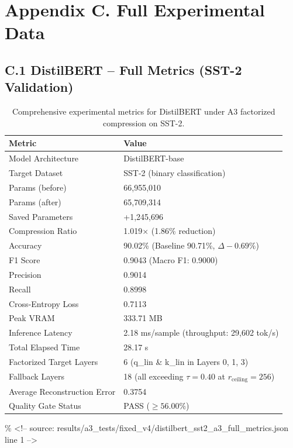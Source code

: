 \section{Appendix C. Full Experimental Data}

\subsection{C.1 DistilBERT -- Full Metrics (SST-2 Validation)}

\begin{table}[H]
\centering
\small
\begin{tabular}{ll}
\toprule
\textbf{Metric} & \textbf{Value} \\
\midrule
Model Architecture & DistilBERT-base \\
Target Dataset & SST-2 (binary classification) \\
Params (before) & 66,955,010 \\
Params (after) & 65,709,314 \\
Saved Parameters & +1,245,696 \\
Compression Ratio & 1.019$\times$ (1.86\% reduction) \\
Accuracy & 90.02\% (Baseline 90.71\%, $\Delta -0.69\%$) \\
F1 Score & 0.9043 (Macro F1: 0.9000) \\
Precision & 0.9014 \\
Recall & 0.8998 \\
Cross-Entropy Loss & 0.7113 \\
Peak VRAM & 333.71 MB \\
Inference Latency & 2.18 ms/sample (throughput: 29,602 tok/s) \\
Total Elapsed Time & 28.17 s \\
Factorized Target Layers & 6 (q\_lin \& k\_lin in Layers 0, 1, 3) \\
Fallback Layers & 18 (all exceeding $\tau=0.40$ at $r_{\mathrm{ceiling}}=256$) \\
Average Reconstruction Error & 0.3754 \\
Quality Gate Status & PASS ($\ge 56.00\%$) \\
\bottomrule
\end{tabular}
\caption{Comprehensive experimental metrics for DistilBERT under A3 factorized compression on SST-2.}
\label{tab:distilbert_full_metrics}
\end{table}
\% \textless{}!-- source: results/a3\_tests/fixed\_v4/distilbert\_sst2\_a3\_full\_metrics.json line 1 --\textgreater{}


